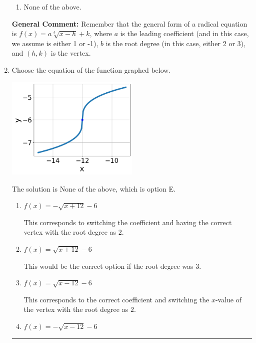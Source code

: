 \documentclass{extbook}[14pt]
\newcommand{\litem}[1]{\item #1

\rule{\textwidth}{0.4pt}}
\begin{document}
\begin{enumerate}
{\begin{enumerate}[label=\Alph*.]
\item None of the above.\end{enumerate}
\textbf{General Comment:} Remember that the general form of a radical equation is $ f(x) = a \sqrt[b]{x - h} + k $, where $a$ is the leading coefficient (and in this case, we assume is either 1 or -1), $b$ is the root degree (in this case, either 2 or 3), and $(h, k)$ is the vertex.
}
\litem{
Choose the equation of the function graphed below.

\begin{center}
    \includegraphics[width=0.5\textwidth]{../Figures/radicalGraphToEquationC.png}
\end{center}



The solution is \( \text{None of the above} \), which is option E.\begin{enumerate}[label=\Alph*.]
\item \( f(x) = - \sqrt{x + 12} - 6 \)

This corresponds to switching the coefficient and having the correct vertex with the root degree as $2$.
\item \( f(x) = \sqrt{x + 12} - 6 \)

This would be the correct option if the root degree was $3$.
\item \( f(x) = \sqrt{x - 12} - 6 \)

This corresponds to the correct coefficient and switching the $x$-value of the vertex with the root degree as $2$.
\item \( f(x) = - \sqrt{x - 12} - 6 \)


\end{enumerate}}
\end{enumerate}
\end{document}
